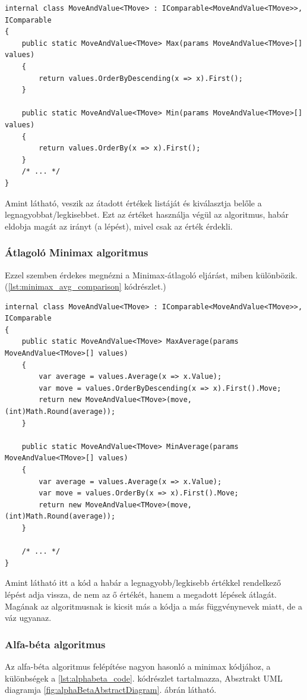 \documentclass[twoside, a4paper, 12pt]{article}
\begin{document}
\begin{lstlisting}[caption=Minimax összehasonlítás, label=lst:minimax_comparison, float]
internal class MoveAndValue<TMove> : IComparable<MoveAndValue<TMove>>, IComparable
{
	public static MoveAndValue<TMove> Max(params MoveAndValue<TMove>[] values)
	{
		return values.OrderByDescending(x => x).First();
	}
	
	public static MoveAndValue<TMove> Min(params MoveAndValue<TMove>[] values)
	{
		return values.OrderBy(x => x).First();
	}
	/* ... */
}
\end{lstlisting}

Amint látható, veszik az átadott értékek listáját és kiválasztja belőle a legnagyobbat/legkisebbet. Ezt az értéket használja végül az algoritmus, habár eldobja magát az irányt (a lépést), mivel csak az érték érdekli.

\subsubsection{Átlagoló Minimax algoritmus}
Ezzel szemben érdekes megnézni a Minimax-átlagoló eljárást, miben különbözik. (\ref{lst:minimax_avg_comparison} kódrészlet.)

\begin{lstlisting}[caption=Minimax-átlagoló összehasonlítás, label=lst:minimax_avg_comparison, float]
internal class MoveAndValue<TMove> : IComparable<MoveAndValue<TMove>>, IComparable
{
	public static MoveAndValue<TMove> MaxAverage(params MoveAndValue<TMove>[] values)
	{
		var average = values.Average(x => x.Value);
		var move = values.OrderByDescending(x => x).First().Move;
		return new MoveAndValue<TMove>(move, (int)Math.Round(average));
	}
	
	public static MoveAndValue<TMove> MinAverage(params MoveAndValue<TMove>[] values)
	{
		var average = values.Average(x => x.Value);
		var move = values.OrderBy(x => x).First().Move;
		return new MoveAndValue<TMove>(move, (int)Math.Round(average));
	}
	
	/* ... */
}
\end{lstlisting}

Amint látható itt a kód a habár a legnagyobb/legkisebb értékkel rendelkező lépést adja vissza, de nem az ő értékét, hanem a megadott lépések átlagát. Magának az algoritmusnak is kicsit más a kódja a más függvénynevek miatt, de a váz ugyanaz.

\subsubsection{Alfa-béta algoritmus}
Az alfa-béta algoritmus felépítése nagyon hasonló a minimax kódjához, a különbségek a \ref{lst:alphabeta_code}. kódrészlet tartalmazza, Absztrakt UML diagramja \ref{fig:alphaBetaAbstractDiagram}. ábrán látható.
\end{document}
